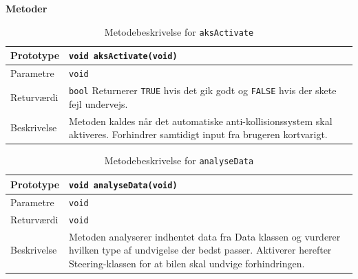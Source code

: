 \textbf{Metoder}


\begin{table}[h]
\begin{tabularx}{\textwidth}{| L{2.5 cm} | Z |} \hline
Prototype & \texttt{void aksActivate(void)} \\\hline
Parametre & \texttt{void}  \\\hline
Returværdi &  \texttt{bool} \newline Returnerer \texttt{TRUE} hvis det gik godt og \texttt{FALSE} hvis der skete fejl undervejs. \\\hline
Beskrivelse & Metoden kaldes når det automatiske anti-kollisionssystem skal aktiveres. Forhindrer samtidigt input fra brugeren kortvarigt. \\\hline
\end{tabularx}
\caption{Metodebeskrivelse for \texttt{aksActivate}}
\label{table:met_aks_aksActivate}
\end{table}

\begin{table}[h]
\begin{tabularx}{\textwidth}{| L{2.5 cm} | Z |} \hline
Prototype & \texttt{void analyseData(void)} \\\hline
Parametre & \texttt{void}  \\\hline
Returværdi &  \texttt{void}  \\\hline
Beskrivelse & Metoden analyserer indhentet data fra Data klassen og vurderer hvilken type af undvigelse der bedst passer. Aktiverer herefter Steering-klassen for at bilen skal undvige forhindringen. \\\hline
\end{tabularx}
\caption{Metodebeskrivelse for \texttt{analyseData}}
\label{table:met_aks_analyseData}
\end{table}